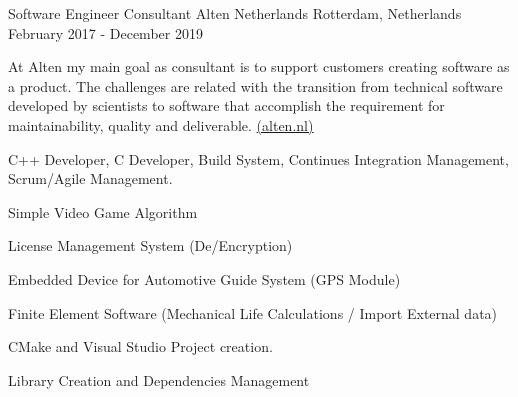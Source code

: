 \begin{cventries}
  \cventry
    {Software Engineer Consultant}
    {Alten Netherlands}
    {Rotterdam, Netherlands}
    {February 2017 - December 2019}
    {          
    At Alten my main goal as consultant is to support customers creating software as a product. The challenges are related with the transition from technical software developed by scientists  to software that accomplish the requirement for maintainability, quality and deliverable. \href{https://www.alten.nl}{(alten.nl)}\newline
    \begin{cvparagraph}
    \vspace{2mm}
     C++ Developer, C Developer, Build System, Continues Integration Management, Scrum/Agile Management.
    \end{cvparagraph}
    \begin{cvparagraph}
         \vspace{5 mm}
       \begin{cvitems}     
       \item Simple Video Game Algorithm
       \item License Management System (De/Encryption)
       \item Embedded Device for Automotive Guide System (GPS Module)
       \item Finite Element Software (Mechanical Life Calculations / Import External data)
       \item CMake and Visual Studio Project creation.
       \item Library Creation and Dependencies Management
       \end{cvitems}
    \end{cvparagraph}
    }
    

\end{cventries}
